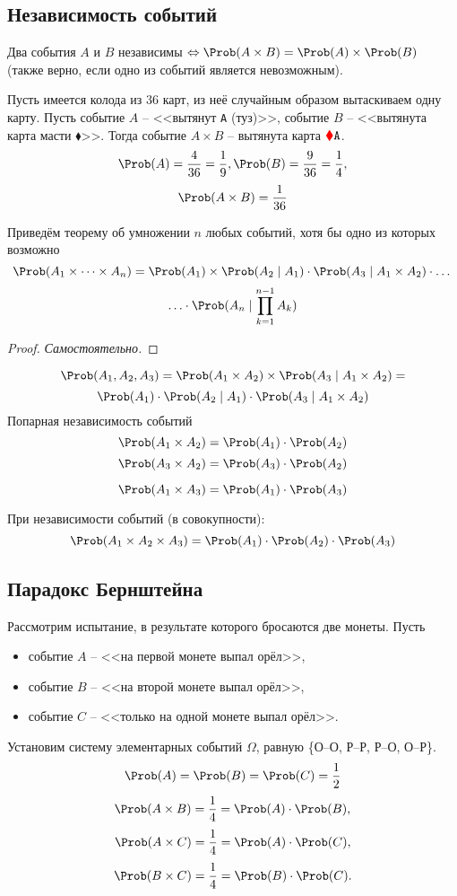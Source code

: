 \subsection{Независимость событий}
\begin{definition}
	Два события $A$ и $B$ независимы $\Leftrightarrow \Prob(A \times B) = \Prob(A) \times \Prob(B)$ (также верно, если одно из событий является невозможным).
\end{definition}
\begin{example}
	Пусть имеется колода из 36 карт, из неё случайным образом вытаскиваем одну карту. Пусть событие $A$ -- <<вытянут \texttt{A} (туз)>>, событие $B$ -- <<вытянута карта масти {\color{red} $\blacklozenge$}>>. Тогда событие $A \times B$ -- вытянута карта ${\color{red} \blacklozenge} \texttt{A}$.
	\[
		\Prob(A) = \frac{4}{36} = \frac{1}{9}, \Prob(B) = \frac{9}{36} = \frac{1}{4},
	\]
	\[
		\Prob(A \times B) = \frac{1}{36}
	\]
\end{example}
Приведём теорему об умножении $n$ любых событий, хотя бы одно из которых возможно
\[
	\Prob(A_1 \times \dots \times A_n) = \Prob(A_1) \times \Prob(A_2 \mid A_1) \cdot \Prob(A_3 \mid A_1 \times A_2) \cdot \dots
\]
\[
	\ldots \cdot \Prob(A_n \mid \prod\limits_{k = 1}^{n-1} A_k)
\]
\begin{proof}
\textit{Самостоятельно.}
\end{proof}
\[
	\Prob(A_1, A_2, A_3) = \Prob(A_1 \times A_2) \times \Prob(A_3 \mid A_1 \times A_2) =
\]
\[
	\Prob(A_1) \cdot \Prob(A_2 \mid A_1) \cdot \Prob(A_3 \mid A_1 \times A_2)
\]
Попарная независимость событий
\begin{equation}\label{1-5-3}
		\Prob(A_1 \times A_2) = \Prob(A_1) \cdot \Prob(A_2)
\end{equation}
\[
	\Prob(A_3 \times A_2) = \Prob(A_3) \cdot \Prob(A_2)
\]

\[
	\Prob(A_1 \times A_3) = \Prob(A_1) \cdot \Prob(A_3)
\]

При независимости событий (в совокупности):
\begin{equation}\label{1-5-4}
	\Prob(A_1 \times A_2 \times A_3) = \Prob(A_1) \cdot \Prob(A_2) \cdot \Prob(A_3)
\end{equation}
\subsection{Парадокс Бернштейна}
Рассмотрим испытание, в результате которого бросаются две монеты. Пусть
\begin{itemize}
	\item событие $A$ -- <<на первой монете выпал орёл>>,
	\item событие $B$ -- <<на второй монете выпал орёл>>,
	\item событие $C$ -- <<только на одной монете выпал орёл>>.
\end{itemize}
Установим систему элементарных событий $\Omega$, равную \{О--О, Р--Р, Р--О, О--Р\}.
\[
	\Prob(A) = \Prob(B) = \Prob(C) = \frac{1}{2}
\]
\[ \Prob(A \times B) = \frac{1}{4} = \Prob(A) \cdot \Prob(B), \]
\[ \Prob(A \times C) = \frac{1}{4} = \Prob(A) \cdot \Prob(C), \]
\[ \Prob(B \times C) = \frac{1}{4} = \Prob(B) \cdot \Prob(C). \]

